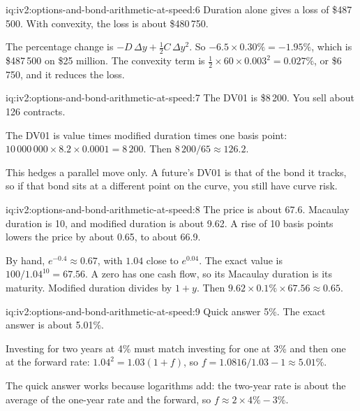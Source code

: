 \begin{solution}{iq:iv2:options-and-bond-arithmetic-at-speed:6}
Duration alone gives a loss of \$487\,500. With convexity, the loss is about \$480\,750.

The percentage change is $-D\,\Delta y + \tfrac12 C\,\Delta y^2$. So $-6.5 \times 0.30\% = -1.95\%$, which is \$487\,500 on \$25 million. The convexity term is $\tfrac12 \times 60 \times 0.003^2 = 0.027\%$, or \$6\,750, and it reduces the loss.

\end{solution}

\begin{solution}{iq:iv2:options-and-bond-arithmetic-at-speed:7}
The DV01 is \$8\,200. You sell about 126 contracts.

The DV01 is value times modified duration times one basis point: $10\,000\,000 \times 8.2 \times 0.0001 = 8\,200$. Then $8\,200/65 \approx 126.2$.

This hedges a parallel move only. A future's DV01 is that of the bond it tracks, so if that bond sits at a different point on the curve, you still have curve risk.

\end{solution}

\begin{solution}{iq:iv2:options-and-bond-arithmetic-at-speed:8}
The price is about 67.6. Macaulay duration is 10, and modified duration is about 9.62. A rise of 10 basis points lowers the price by about 0.65, to about 66.9.

By hand, $e^{-0.4} \approx 0.67$, with $1.04$ close to $e^{0.04}$. The exact value is $100/1.04^{10} = 67.56$. A zero has one cash flow, so its Macaulay duration is its maturity. Modified duration divides by $1 + y$. Then $9.62 \times 0.1\% \times 67.56 \approx 0.65$.

\end{solution}

\begin{solution}{iq:iv2:options-and-bond-arithmetic-at-speed:9}
Quick answer 5\%. The exact answer is about 5.01\%.

Investing for two years at 4\% must match investing for one at 3\% and then one at the forward rate: $1.04^2 = 1.03(1 + f)$, so $f = 1.0816/1.03 - 1 \approx 5.01\%$.

The quick answer works because logarithms add: the two-year rate is about the average of the one-year rate and the forward, so $f \approx 2 \times 4\% - 3\%$.

\end{solution}

